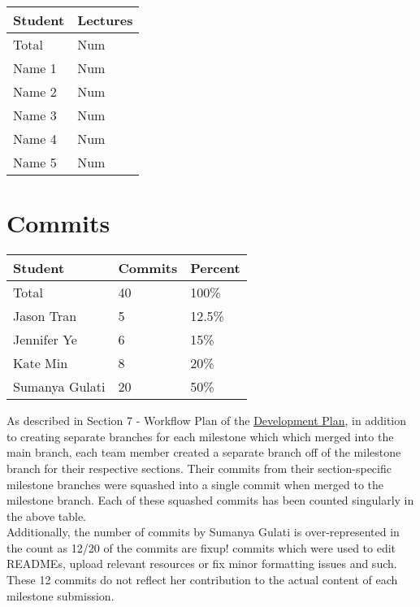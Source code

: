 \documentclass{article}
\begin{document}
\begin{table}[H]
\centering
\begin{tabular}{ll}
\toprule
\textbf{Student} & \textbf{Lectures}\\
\midrule
Total & Num\\
Name 1 & Num\\
Name 2 & Num\\
Name 3 & Num\\
Name 4 & Num\\
Name 5 & Num\\
\bottomrule
\end{tabular}
\end{table}


\section{Commits}

\begin{table}[H]
\centering
\begin{tabular}{lll}
\toprule
\textbf{Student} & \textbf{Commits} & \textbf{Percent}\\
\midrule
Total & 40 & 100\% \\
Jason Tran & 5 & 12.5\% \\
Jennifer Ye & 6 & 15\% \\
Kate Min & 8 & 20\% \\
Sumanya Gulati & 20 & 50\% \\
\bottomrule
\end{tabular}
\end{table}

As described in Section 7 - Workflow Plan of the 
\href{https://github.com/SumanyaG/Alkalytics/blob/main/docs/DevelopmentPlan/DevelopmentPlan.pdf}{Development Plan},
in addition to creating separate branches for each milestone which which merged into the main
branch, each team member created a separate branch off of the milestone branch for their 
respective sections. Their commits from their section-specific milestone branches were squashed
into a single commit when merged to the milestone branch. Each of these squashed commits has been counted
singularly in the above table.\\
\newline
Additionally, the number of commits by Sumanya Gulati is over-represented in the count as 12/20 of the
commits are fixup! commits which were used to edit READMEs, upload relevant resources or fix minor 
formatting issues and such. These 12 commits do not reflect her contribution to the actual content of 
each milestone submission.
\end{document}
